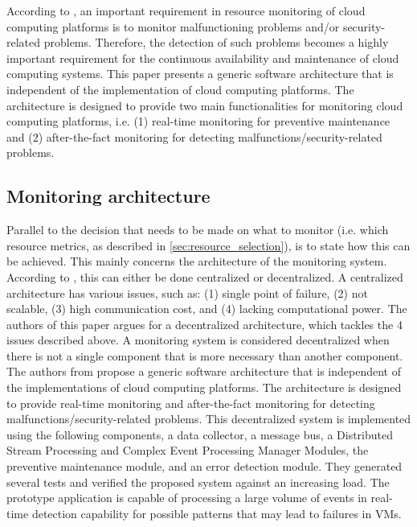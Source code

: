 \noindent
According to \cite{aktas2018hybrid}, an important requirement in resource monitoring of cloud computing platforms is to monitor malfunctioning problems and/or security-related problems. Therefore, the detection of such problems becomes a highly important requirement for the continuous availability and maintenance of cloud computing systems. This paper presents a generic software architecture that is independent of the implementation of cloud computing platforms. The architecture is designed to provide two main functionalities for monitoring cloud computing platforms, i.e. (1) real-time monitoring for preventive maintenance and (2) after-the-fact monitoring for detecting malfunctions/security-related problems.\\

\subsection{Monitoring architecture} \label{sec:monitoring_architecture}
Parallel to the decision that needs to be made on what to monitor (i.e. which resource metrics, as described in \autoref{sec:resource_selection}), is to state how this can be achieved. This mainly concerns the architecture of the monitoring system. According to \cite{kumar2017inspection}, this can either be done centralized or decentralized. A centralized architecture has various issues, such as: (1) single point of failure, (2) not scalable, (3) high communication cost, and (4) lacking computational power. The authors of this paper argues for a decentralized architecture, which tackles the 4 issues described above. A monitoring system is considered decentralized when there is not a single component that is more necessary than another component.\\

\noindent
The authors from \cite{aktas2018hybrid} propose a generic software architecture that is independent of the implementations of cloud computing platforms. The architecture is designed to provide real-time monitoring and after-the-fact monitoring for detecting malfunctions/security-related problems. This decentralized system is implemented using the following components, a data collector, a message bus, a Distributed Stream Processing and Complex Event Processing Manager Modules, the preventive maintenance module, and an error detection module. They generated several tests and verified the proposed system against an increasing load. The prototype application is capable of processing a large volume of events in real-time detection capability for possible patterns that may lead to failures in VMs.\\

